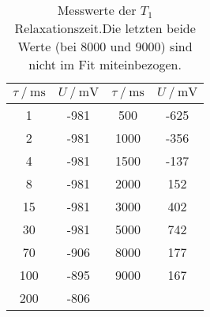 \begin{table}
\centering
\caption{Messwerte der $T_1$ Relaxationszeit.Die letzten beide Werte (bei 8000 und 9000) sind nicht im Fit miteinbezogen.}
\begin{tabular}{S[table-format=3.0]  S[table-format=4.0] | S[table-format=3.0]  S[table-format=4.0]  }
\toprule
{} & 
&  &   \\
   & -981 & 500  & -625 \\
2   & -981 & 1000 & -356 \\
4   & -981 & 1500 & -137 \\
8   & -981 & 2000 & 152  \\
15  & -981 & 3000 & 402  \\
30  & -981 & 5000 & 742  \\
70  & -906 & 8000 & 177  \\
100 & -895 & 9000 & 167  \\
200 & -806 \\
\bottomrule
\end{tabular}
\label{table:01}
\end{table}
